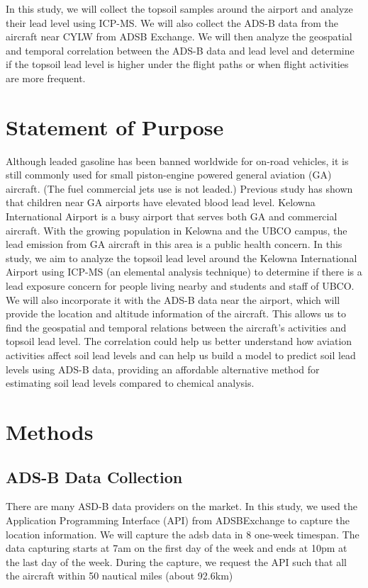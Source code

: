\documentclass[12pt]{article}
\begin{document}
In this study, we will collect the topsoil samples around the airport and analyze their lead level using ICP-MS. We will also collect the ADS-B data from the aircraft near CYLW from ADSB Exchange\cite{adsbexchange}. We will then analyze the geospatial and temporal correlation between the ADS-B data and lead level and determine if the topsoil lead level is higher under the flight paths or when flight activities are more frequent. 
\section{Statement of Purpose}
Although leaded gasoline has been banned worldwide for on-road vehicles, it is still commonly used for small piston-engine powered general aviation (GA) aircraft. (The fuel commercial jets use is not leaded.) Previous study has shown that children near GA airports have elevated blood lead level.\cite{miranda_geospatial_2011} \cite{zahran_leaded_2023} \cite{mills_lead_2022} \cite{zahran_effect_2017} Kelowna International Airport is a busy airport that serves both GA and commercial aircraft. With the growing population in Kelowna and the UBCO campus, the lead emission from GA aircraft in this area is a public health concern. In this study, we aim to analyze the topsoil lead level around the Kelowna International Airport using ICP-MS (an elemental analysis technique) to determine if there is a lead exposure concern for people living nearby and students and staff of UBCO. We will also incorporate it with the ADS-B data near the airport, which will provide the location and altitude information of the aircraft. This allows us to find the geospatial and temporal relations between the aircraft's activities and topsoil lead level. The correlation could help us better understand how aviation activities affect soil lead levels and can help us build a model to predict soil lead levels using ADS-B data, providing an affordable alternative method for estimating soil lead levels compared to chemical analysis.
\section{Methods}
\subsection{ADS-B Data Collection}
There are many ASD-B data providers on the market. In this study, we used the Application Programming Interface (API) from ADSBExchange \cite{adsbexchange} to capture the location information. We will capture the adsb data in 8 one-week timespan. The data capturing starts at 7am on the first day of the week and ends at 10pm at the last day of the week. During the capture, we request the API such that all the aircraft within 50 nautical miles (about 92.6km) 
\end{document}
